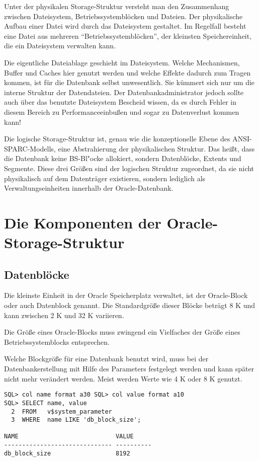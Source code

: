       Unter der physikalen Storage-Struktur versteht man den Zusammenhang zwischen Dateisystem, Betriebssystemblöcken und Dateien. Der physikalische Aufbau einer Datei wird durch das Dateisystem gestaltet. Im Regelfall besteht eine Datei aus mehreren \enquote{Betriebssystemblöcken}, der kleinsten Speichereinheit, die ein Dateisystem verwalten kann.
      \begin{merke}
        Die eigentliche Dateiablage geschieht im Dateisystem. Welche Mechanismen, Buffer und Caches hier genutzt werden und welche Effekte dadurch zum Tragen kommen, ist für die Datenbank selbst unwesentlich. Sie kümmert sich nur um die interne Struktur der Datendateien. Der Datenbankadministrator jedoch sollte auch über das benutzte Dateisystem Bescheid wissen, da es durch Fehler in diesem Bereich zu Performance\-einbußen und sogar zu Datenverlust kommen kann!
      \end{merke}
      Die logische Storage-Struktur ist, genau wie die konzeptionelle Ebene des ANSI-SPARC-Modells, eine Abstrahierung der physikalischen Struktur. Das  heißt, dass die Datenbank keine BS-Bl"ocke allokiert, sondern Datenblöcke, Extents und Segmente. Diese drei Größen sind der logischen Struktur zugeordnet, da sie nicht physikalisch auf dem Datenträger existieren, sondern lediglich als Verwaltungseinheiten innerhalb der Oracle-Datenbank.
    \section{Die Komponenten der Oracle-Storage-Struktur}
      \subsection{Datenblöcke}
        Die kleinste Einheit in der Oracle Speicherplatz verwaltet, ist der Oracle-Block oder auch Datenblock genannt. Die Standardgröße dieser Blöcke beträgt 8 K und kann zwischen 2 K und 32 K variieren.
        \begin{merke}
          Die Größe eines Oracle-Blocks muss zwingend ein Vielfaches der Größe eines  Betriebssystemblocks entsprechen.
        \end{merke}
        Welche Blockgröße für eine Datenbank benutzt wird, muss bei der Datenbankerstellung mit Hilfe des Parameters  festgelegt werden und kann später nicht mehr verändert werden. Meist werden Werte wie 4 K oder 8 K genutzt.
        \begin{lstlisting}[caption={Der Parameter \parameter{db\_block\_size}},label=admin100,language=oracle_sql,alsolanguage=sqlplus]
SQL> col name format a30 SQL> col value format a10
SQL> SELECT name, value
  2  FROM   v$system_parameter
  3  WHERE  name LIKE 'db_block_size';

NAME                           VALUE
------------------------------ ----------
db_block_size                  8192
        \end{lstlisting}
